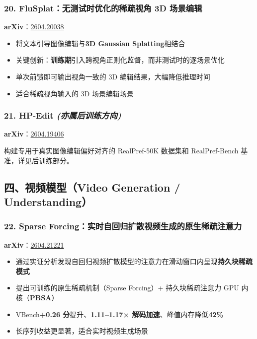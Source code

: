 \subsubsection{20. FluSplat：无测试时优化的稀疏视角 3D 场景编辑}

\textbf{arXiv}：\href{https://arxiv.org/abs/2604.20038}{2604.20038}

\begin{itemize}[leftmargin=1.5em]
  \item 将文本引导图像编辑与\textbf{3D Gaussian Splatting}相结合
  \item 关键创新：\textbf{训练期}引入跨视角正则化监督，而非测试时的逐场景优化
  \item 单次前馈即可输出视角一致的 3D 编辑结果，大幅降低推理时间
  \item 适合稀疏视角输入的 3D 场景编辑场景
\end{itemize}

\subsubsection{21. HP-Edit \textit{(亦属后训练方向)}}

\textbf{arXiv}：\href{https://arxiv.org/abs/2604.19406}{2604.19406}

构建专用于真实图像编辑偏好对齐的 RealPref-50K 数据集和 RealPref-Bench 基准，详见后训练部分。

\subsection{四、视频模型（Video Generation / Understanding）}

\subsubsection{22. Sparse Forcing：实时自回归扩散视频生成的原生稀疏注意力}

\textbf{arXiv}：\href{https://arxiv.org/abs/2604.21221}{2604.21221}

\begin{itemize}[leftmargin=1.5em]
  \item 通过实证分析发现自回归视频扩散模型的注意力在滑动窗口内呈现\textbf{持久块稀疏模式}
  \item 提出可训练的原生稀疏机制（Sparse Forcing）+ 持久块稀疏注意力 GPU 内核（\textbf{PBSA}）
  \item VBench\textbf{+0.26 分}提升、\textbf{1.11–1.17× 解码加速}、峰值内存降低\textbf{42\%}
  \item 长序列收益更显著，适合实时视频生成场景
\end{itemize}

